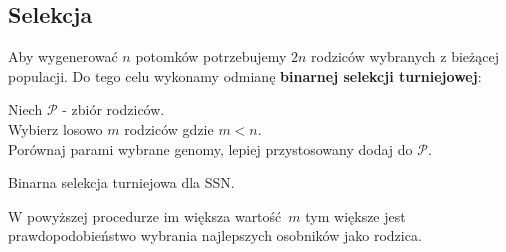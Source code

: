 \documentclass{article}
\begin{document}
\subsection{Selekcja}
Aby wygenerować $n$ potomków potrzebujemy $2n$ rodziców wybranych z bieżącej populacji.
Do tego celu wykonamy odmianę \textbf{binarnej selekcji turniejowej}:\\
\begin{algorithm}[H]
 Niech $\mathcal{P}$ - zbiór rodziców.\\
 Wybierz losowo $m$ rodziców gdzie $m < n$.\\
  {
	Porównaj parami wybrane genomy, lepiej przystosowany dodaj do $\mathcal{P}$.\\
 }
 \caption{Binarna selekcja turniejowa dla SSN.}
\end{algorithm}
W powyższej procedurze im większa wartość $m$ tym większe jest prawdopodobieństwo wybrania
najlepszych osobników jako rodzica.
\end{document}
